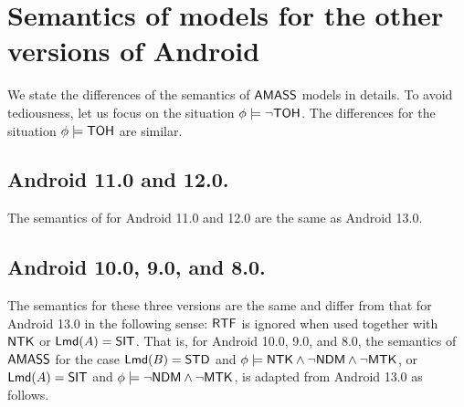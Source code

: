 \section{Semantics of {\AMASS} models for the other versions of Android}
%
We state the differences of the semantics of {$\textsf{AMASS}$} models in details. To avoid tediousness, let us focus on the situation $\phi \models \neg {\sf TOH}$. The differences for the situation $\phi \models {\sf TOH}$ are similar. 

\subsection{Android 11.0 and 12.0.}
The semantics of {\AMASS} for Android 11.0 and 12.0 are the same as Android 13.0. 

\subsection{Android 10.0, 9.0, and 8.0.}
The semantics for these three versions are the same and differ from that for Android 13.0 in the following sense: ${\sf RTF}$ is ignored when used together with ${\sf NTK}$ or ${\sf Lmd}(A) = {\sf SIT}$. 
That is, for Android 10.0, 9.0, and 8.0, the semantics of $\textsf{AMASS}$ for the case ${\sf Lmd}(B) = {\sf STD}$ and $\phi \models {\sf NTK} \wedge \neg {\sf NDM}\wedge \neg {\sf MTK}$, or ${\sf Lmd}(A) = {\sf SIT}$ and $\phi \models \neg{\sf NDM}\wedge\neg{\sf MTK}$, is adapted from Android 13.0 as follows.

